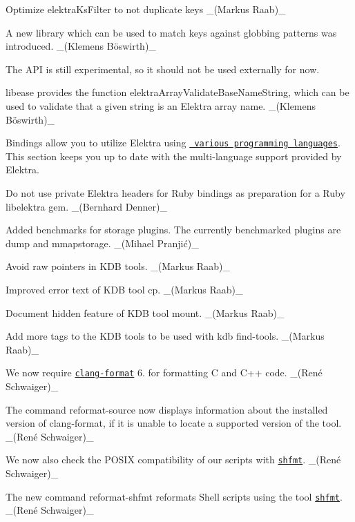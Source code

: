 Optimize elektra\+Ks\+Filter to not duplicate keys \+\_\+(\+Markus Raab)\+\_\+

A new library which can be used to match keys against globbing patterns was introduced. \+\_\+(Klemens Böswirth)\+\_\+

The A\+PI is still experimental, so it should not be used externally for now.

{\ttfamily libease} provides the function {\ttfamily elektra\+Array\+Validate\+Base\+Name\+String}, which can be used to validate that a given string is an Elektra array name. \+\_\+(Klemens Böswirth)\+\_\+

Bindings allow you to utilize Elektra using \href{https://www.libelektra.org/bindings/readme}{\texttt{ various programming languages}}. This section keeps you up to date with the multi-\/language support provided by Elektra.

Do not use private Elektra headers for Ruby bindings as preparation for a Ruby {\ttfamily libelektra} gem. \+\_\+(\+Bernhard Denner)\+\_\+


\begin{DoxyItemize}
\item Added benchmarks for storage plugins. The currently benchmarked plugins are {\ttfamily dump} and {\ttfamily mmapstorage}. \+\_\+(Mihael Pranjić)\+\_\+
\item Avoid raw pointers in K\+DB tools. \+\_\+(\+Markus Raab)\+\_\+
\item Improved error text of K\+DB tool {\ttfamily cp}. \+\_\+(\+Markus Raab)\+\_\+
\item Document hidden feature of K\+DB tool {\ttfamily mount}. \+\_\+(\+Markus Raab)\+\_\+
\item Add more tags to the K\+DB tools to be used with {\ttfamily kdb find-\/tools}. \+\_\+(\+Markus Raab)\+\_\+
\end{DoxyItemize}


\begin{DoxyItemize}
\item We now require \href{https://clang.llvm.org/docs/ClangFormat.html}{\texttt{ {\ttfamily clang-\/format}}} 6. for formatting C and C++ code. \+\_\+(René Schwaiger)\+\_\+
\item The command {\ttfamily reformat-\/source} now displays information about the installed version of {\ttfamily clang-\/format}, if it is unable to locate a supported version of the tool. \+\_\+(René Schwaiger)\+\_\+
\item We now also check the P\+O\+S\+IX compatibility of our scripts with \href{https://github.com/mvdan/sh}{\texttt{ {\ttfamily shfmt}}}. \+\_\+(René Schwaiger)\+\_\+
\item The new command {\ttfamily reformat-\/shfmt} reformats Shell scripts using the tool \href{https://github.com/mvdan/sh}{\texttt{ {\ttfamily shfmt}}}. \+\_\+(René Schwaiger)\+\_\+
\end{DoxyItemize}


